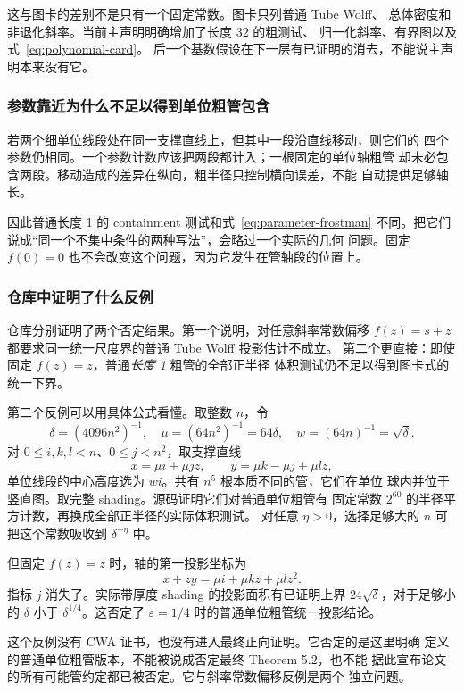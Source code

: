\documentclass[UTF8,11pt,a4paper,fontset=none]{ctexart}
\newcommand{\eps}{\varepsilon}
\begin{document}
这与图卡的差别不是只有一个固定常数。图卡只列普通 Tube Wolff、
总体密度和非退化斜率。当前主声明明确增加了长度 32 的粗测试、
归一化斜率、有界图以及式~\eqref{eq:polynomial-card}。
后一个基数假设在下一层有已证明的消去，不能说主声明本来没有它。

\subsubsection{参数靠近为什么不足以得到单位粗管包含}

若两个细单位线段处在同一支撑直线上，但其中一段沿直线移动，则它们的
四个参数仍相同。一个参数计数应该把两段都计入；一根固定的单位轴粗管
却未必包含两段。移动造成的差异在纵向，粗半径只控制横向误差，不能
自动提供足够轴长。

因此普通长度 1 的 containment 测试和式~\eqref{eq:parameter-frostman}
不同。把它们说成“同一个不集中条件的两种写法”，会略过一个实际的几何
问题。固定 $f(0)=0$ 也不会改变这个问题，因为它发生在管轴段的位置上。

\subsubsection{仓库中证明了什么反例}

仓库分别证明了两个否定结果。第一个说明，对任意斜率常数偏移
$f(z)=s+z$ 都要求同一统一尺度界的普通 Tube Wolff 投影估计不成立。
第二个更直接：即使固定 $f(z)=z$，普通\emph{长度 1} 粗管的全部正半径
体积测试仍不足以得到图卡式的统一下界。

第二个反例可以用具体公式看懂。取整数 $n$，令
\[
 \delta=(4096n^2)^{-1},\quad \mu=(64n^2)^{-1}=64\delta,
 \quad w=(64n)^{-1}=\sqrt\delta.
\]
对 $0\leq i,k,l<n$、$0\leq j<n^2$，取支撑直线
\[
 x=\mu i+\mu jz,\qquad y=\mu k-\mu j+\mu lz,
\]
单位线段的中心高度选为 $wi$。共有 $n^5$ 根本质不同的管，它们在单位
球内并位于竖直图。取完整 shading。源码证明它们对普通单位粗管有
固定常数 $2^{60}$ 的半径平方计数，再换成全部正半径的实际体积测试。
对任意 $\eta>0$，选择足够大的 $n$ 可把这个常数吸收到
$\delta^{-\eta}$ 中。

但固定 $f(z)=z$ 时，轴的第一投影坐标为
\[
 x+zy=\mu i+\mu kz+\mu lz^2.
\]
指标 $j$ 消失了。实际带厚度 shading 的投影面积有已证明上界
$24\sqrt\delta$，对于足够小的 $\delta$ 小于
$\delta^{1/4}$。这否定了 $\eps=1/4$ 时的普通单位粗管统一投影结论。

这个反例没有 CWA 证书，也没有进入最终正向证明。它否定的是这里明确
定义的普通单位粗管版本，不能被说成否定最终 Theorem 5.2，也不能
据此宣布论文的所有可能管约定都已被否定。它与斜率常数偏移反例是两个
独立问题。
\end{document}
